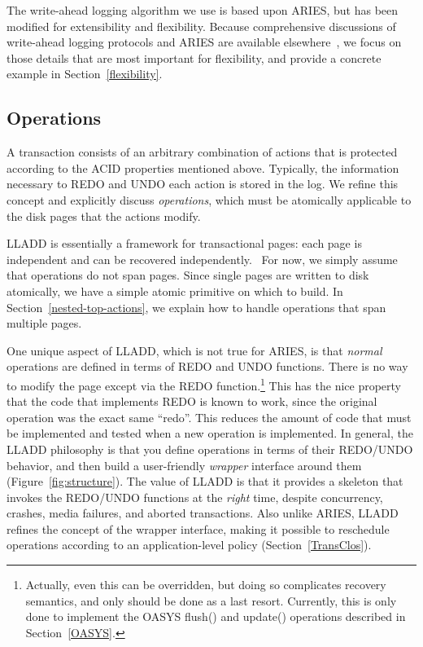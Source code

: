 \documentclass[10pt,letterpaper,twocolumn,english]{article}
\newcommand{\yad}{LLADD\xspace}
\newcommand{\oasys}{OASYS\xspace}
\begin{document}
The write-ahead logging algorithm we use is based upon ARIES, but has been
modified for extensibility and flexibility. Because comprehensive
discussions of write-ahead logging protocols and ARIES are available
elsewhere~\cite{haerder, aries}, we focus on those details that are
most important for flexibility, and provide a concrete example in Section~\ref{flexibility}.


\subsection{Operations}
\label{sub:OperationProperties}

A transaction consists of an arbitrary combination of actions that
is protected according to the ACID properties mentioned above.
Typically, the
information necessary to REDO and UNDO each action is stored in the
log.  We refine this concept and explicitly discuss {\em operations},
which must be atomically applicable to the disk pages that the actions modify.

\yad is essentially a framework for transactional pages: each page is
independent and can be recovered independently.~\cite{physiologicalLogging} For now, we simply
assume that operations do not span pages.  Since single pages are
written to disk atomically, we have a simple atomic primitive on which
to build. In Section~\ref{nested-top-actions}, we explain how to
handle operations that span multiple pages.

One unique aspect of \yad, which is not true for ARIES, is that {\em
normal} operations are defined in terms of REDO and UNDO
functions. There is no way to modify the page except via the REDO
function.\footnote{Actually, even this can be overridden, but doing so
complicates recovery semantics, and only should be done as a last
resort.  Currently, this is only done to implement the \oasys flush()
and update() operations described in Section~\ref{OASYS}.}  This has
the nice property that the code that implements REDO is known to work, 
since the
original operation was the exact same ``redo''.  This reduces the amount of code that must be implemented and tested when a new operation is implemented.  In general, the \yad
philosophy is that you define operations in terms of their REDO/UNDO
behavior, and then build a user-friendly {\em wrapper} interface
around them (Figure~\ref{fig:structure}).  The value of \yad is that it provides a skeleton that
invokes the REDO/UNDO functions at the {\em right} time, despite
concurrency, crashes, media failures, and aborted transactions.  Also
unlike ARIES, \yad refines the concept of the wrapper interface,
making it possible to reschedule operations according to an
application-level policy (Section~\ref{TransClos}).
\end{document}
